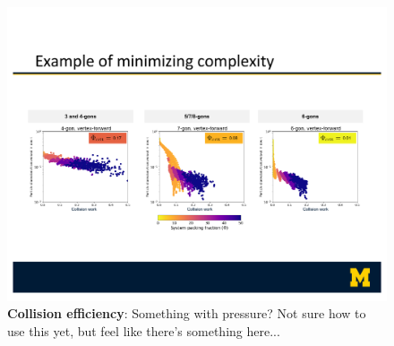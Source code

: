 \begin{figure}[t]
\begin{center}
\includegraphics[width=6.5in]{../figures/Fig3.pdf}
\caption{\textbf{Collision efficiency}: Something with pressure? Not sure how to use this yet, but feel like there's something here...}
\label{fig:pressure}
\end{center}
\end{figure}


